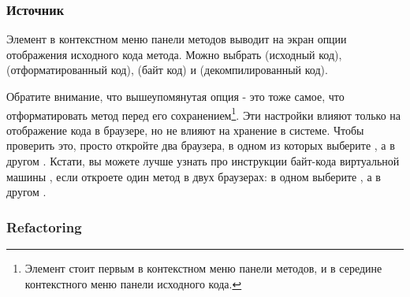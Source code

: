 \documentclass[a4paper,10pt,twoside]{book}
\begin{document}
\subsubsection{Источник}


Элемент  в контекстном меню панели методов выводит на экран опции отображения исходного кода метода.  Можно выбрать  (исходный код),  (отформатированный код),  (байт код) и  (декомпилированный код).


Обратите внимание, что вышеупомянутая опция  - это тоже самое, что отформатировать метод перед его сохранением\footnote{Элемент  стоит первым в контекстном меню панели методов, и в середине контекстного меню панели исходного кода.}. Эти настройки влияют только на отображение кода в браузере, но не влияют на хранение в системе. Чтобы проверить это, просто откройте два браузера, в одном из которых выберите , а в другом . Кстати, вы можете лучше узнать про инструкции байт-кода виртуальной машины \pharo, если откроете один метод в двух браузерах: в одном выберите , а в другом .

\subsubsection{Refactoring}
\end{document}
